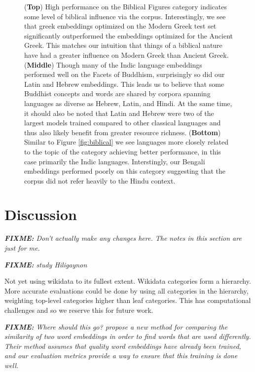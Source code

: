 \documentclass[11pt,a4paper]{article}
\newcommand{\fixme}[1]{{\color{red}\itshape \textbf{FIXME:} {#1}}}
\begin{document}
\begin{figure}
\caption{
    (\textbf{Top})
    High performance on the Biblical Figures category indicates some level of biblical influence via the corpus. 
    Interestingly, we see that greek embeddings optimized on the Modern Greek test set significantly outperformed the embeddings optimized for the Ancient Greek. 
    This matches our intuition that things of a biblical nature have had a greater influence on Modern Greek than Ancient Greek.
    (\textbf{Middle})
    Though many of the Indic language embeddings performed well on the Facets of Buddhism, 
    surprisingly so did our Latin and Hebrew embeddings. 
    This leads us to believe that some Buddhist concepts and words are shared by corpora spanning languages as diverse as Hebrew, Latin, and Hindi. 
    At the same time, it should also be noted that Latin and Hebrew were two of the largest models trained compared to other classical languages and thus also likely benefit from greater resource richness.
    (\textbf{Bottom})
    Similar to Figure \ref{fig:biblical} we see languages more closely related to the topic of the category achieving better performance, in this case primarily the Indic languages. 
    Interstingly, our Bengali embeddings performed poorly on this category suggesting that the corpus did not refer heavily to the Hindu context.
}
\label{fig:downstream}
\end{figure}


\section{Discussion}
\label{sec:discussion}

\fixme{
Don't actually make any changes here.
The notes in this section are just for me.
}

\fixme{
    \citet{michel-etal-2020-exploring} study Hiligaynon
}

Not yet using wikidata to its fullest extent.
Wikidata categories form a hierarchy.
More accurate evaluations could be done by using all categories in the hierarchy,
weighting top-level categories higher than leaf categories.
This has computational challenges and so we reserve this for future work.

\fixme{Where should this go?
\citet{gonen2020simple} propose a new method for comparing the similarity of two word embeddings in order to find words that are used differently.
Their method assumes that quality word embeddings have already been trained,
and our evaluation metrics provide a way to ensure that this training is done well.
}
\end{document}
